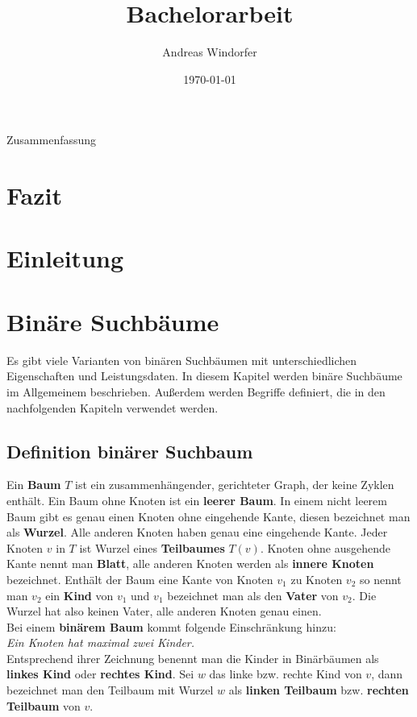 \documentclass[a4paper,12pt]{article}
\title{Bachelorarbeit}
\author{

	Andreas Windorfer\\
}
\date{\today}
\begin{document}
\maketitle
\newpage
Zusammenfassung
\newpage
\tableofcontents


\newpage

\section{Fazit}
\section{Einleitung}

\section {Binäre Suchbäume}
Es gibt viele Varianten von binären Suchbäumen mit unterschiedlichen Eigenschaften und Leistungsdaten. In diesem Kapitel werden binäre Suchbäume im Allgemeinem beschrieben. Außerdem werden Begriffe definiert, die in den nachfolgenden Kapiteln verwendet werden. \\
\subsection{Definition binärer Suchbaum}
Ein \textbf{Baum} $T$ ist ein zusammenhängender, gerichteter Graph, der keine Zyklen enthält. Ein Baum ohne Knoten ist ein \textbf{leerer Baum}. In einem nicht leerem Baum gibt es genau einen Knoten ohne eingehende Kante, diesen bezeichnet man als \textbf{Wurzel}. Alle anderen Knoten haben genau eine eingehende Kante. Jeder Knoten $v$ in $T$ ist Wurzel eines \textbf{Teilbaumes} $T(v)$. Knoten ohne ausgehende Kante nennt man \textbf{Blatt}, alle anderen Knoten werden als \textbf{innere Knoten} bezeichnet. Enthält der Baum eine Kante von Knoten $v_1$ zu Knoten $v_2$ so nennt man $v_2$ ein \textbf{Kind} von $v_1$ und $v_1$ bezeichnet man als den  \textbf{Vater} von $v_2$. Die Wurzel hat also keinen Vater, alle anderen Knoten genau einen.\\
Bei einem \textbf{binärem Baum} kommt folgende Einschränkung hinzu:  \\
\textit{Ein Knoten hat maximal zwei Kinder.}\\ 
Entsprechend ihrer Zeichnung benennt man die Kinder in Binärbäumen als \textbf{linkes Kind} oder \textbf{rechtes Kind}. Sei $w$ das linke bzw. rechte Kind von $v$, dann bezeichnet man den Teilbaum mit Wurzel $w$ als \textbf{linken Teilbaum} bzw. \textbf{rechten Teilbaum}  von $v$.  
\end{document}
